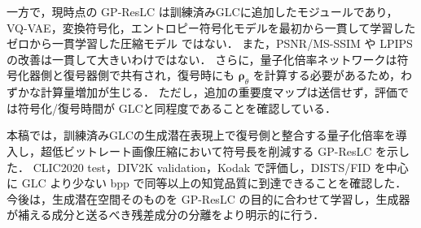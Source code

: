 \documentclass[MIRU,submit]{miru2026j}
\begin{document}
一方で，現時点の GP-ResLC は訓練済みGLCに追加したモジュールであり，VQ-VAE，変換符号化，エントロピー符号化モデルを最初から一貫して学習したゼロから一貫学習した圧縮モデル ではない．
また，PSNR/MS-SSIM や LPIPS の改善は一貫して大きいわけではない．
さらに，量子化倍率ネットワークは符号化器側と復号器側で共有され，復号時にも $\boldsymbol{\rho}_\theta$ を計算する必要があるため，わずかな計算量増加が生じる．
ただし，追加の重要度マップは送信せず，評価では符号化/復号時間が GLCと同程度であることを確認している．

本稿では，訓練済みGLCの生成潜在表現上で復号側と整合する量子化倍率を導入し，超低ビットレート画像圧縮において符号長を削減する GP-ResLC を示した．
CLIC2020 test，DIV2K validation，Kodak で評価し，DISTS/FID を中心に GLC より少ない bpp で同等以上の知覚品質に到達できることを確認した．
今後は，生成潜在空間そのものを GP-ResLC の目的に合わせて学習し，生成器が補える成分と送るべき残差成分の分離をより明示的に行う．
\end{document}
